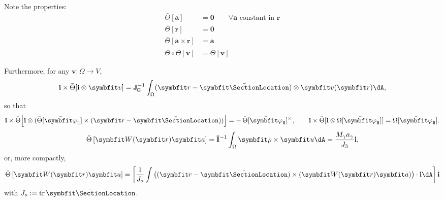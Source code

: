 Note the properties: 
\begin{subequations}
\begin{align}
\bar{\Theta}[\bm{a}] &= \mathbf{0} 
\qquad \forall \bm{a}\text{ constant in }\bm{r} \label{eq:barTheta-vanish}\\
\bar{\Theta}[\bm{r}] &= \mathbf{0} \\
\bar{\Theta}[\bm{a}\times\bm{r}] &= \bm{a} \label{eq:barTheta-cross-r} \\
\bar{\Theta}\circ\bar{\Theta}[\bm{v}] &= \bar{\Theta}[\bm{v}]
\end{align}
\label{eq:rotavg-identities}
\end{subequations}
\begin{Details}
Furthermore, for any \(\bm v:\Omega\to V\),
\[
\FrameBasis\times\bar\Theta[\FrameBasis\otimes\bm v]
=\IntRGoRG^{-1} \int_{\Omega}(\bm{r}-\CentroidLocation)\otimes\bm v(\bm{r})\dA,
\]
so that
\begin{equation}
\FrameBasis\times\bar\Theta\Big[\FrameBasis\otimes(\bar\Theta[\WarpShearShape{}]\times(\bm{r}-\CentroidLocation))\Big]
=-\,\bar\Theta[\WarpShearShape{}]^{\times},
\qquad
\FrameBasis\times\bar\Theta[\FrameBasis\otimes\Section[\WarpShearShape{}]]
=\Section[\WarpShearShape{}].
\label{eq:theta-rank-1}
\end{equation}
\[
\RotationAverage{\bm{W}(\bm{r})\bm{a}}
= \CentroidStaticInertia^{-1}\int_\Section \bm{\rho}\times\bm{u}\dA
= \frac{M_\gamma a_\gamma}{J_3}\FrameBasis,
\]
or, more compactly,
\[
\RotationAverage{\bm{W}(\bm{r})\bm{a}}
= \left[\frac{1}{\Io}
\int\big((\bm{r}-\CentroidLocation)\times (\bm{W}(\bm{r})\bm{a})\big)\cdot\mathbf{i} \dA
\right]\FrameBasis
\]
with \(\Io := \operatorname{tr}\CentroidLocation\).
\end{Details}
